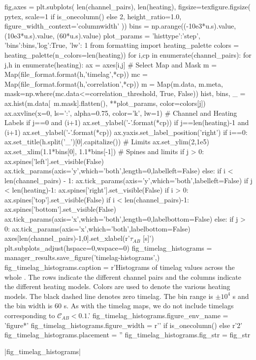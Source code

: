 \begin{pycode}
fig,axes = plt.subplots(
    len(channel_pairs), len(heating),
    figsize=texfigure.figsize(
        pytex,
        scale=1 if is_onecolumn() else 2,
        height_ratio=1.0,
        figure_width_context='columnwidth'
))
bins = np.arange((-10e3*u.s).value, (10e3*u.s).value, (60*u.s).value)
plot_params = {'histtype':'step', 'bins':bins,'log':True,
                'lw': 1}
from formatting import heating_palette
colors = heating_palette(n_colors=len(heating))
for i,cp in enumerate(channel_pairs):
    for j,h in enumerate(heating):
        ax = axes[i,j]
        # Select Map and Mask
        m = Map(file_format.format(h,'timelag',*cp))
        mc = Map(file_format.format(h,'correlation',*cp))
        m = Map(m.data, m.meta, mask=np.where(mc.data<=correlation_threshold, True, False))
        hist, bins, _ = ax.hist(m.data[~m.mask].flatten(), **plot_params, color=colors[j])
        ax.axvline(x=0, ls=':', alpha=0.75, color='k', lw=1)
        # Channel and Heating Labels
        if j==0 and (i+1)%
            ax.set_ylabel('{}-{}'.format(*cp))
        if j==len(heating)-1 and (i+1)%
            ax.set_ylabel('{}-{}'.format(*cp))
            ax.yaxis.set_label_position('right')
        if i==0:
            ax.set_title(h.split('_')[0].capitalize())
        # Limits
        ax.set_ylim(2,1e5)
        ax.set_xlim(1.1*bins[0], 1.1*bins[-1])
        # Spines and limits
        if j > 0:
            ax.spines['left'].set_visible(False)
            ax.tick_params(axis='y',which='both',length=0,labelleft=False)
        else:
            if i < len(channel_pairs) - 1:
                ax.tick_params(axis='y',which='both',labelleft=False)
        if j < len(heating)-1:
            ax.spines['right'].set_visible(False)
        if i > 0:
            ax.spines['top'].set_visible(False)
        if i < len(channel_pairs)-1:
            ax.spines['bottom'].set_visible(False)
            ax.tick_params(axis='x',which='both',length=0,labelbottom=False)
        else:
            if j > 0:
                ax.tick_params(axis='x',which='both',labelbottom=False)
axes[len(channel_pairs)-1,0].set_xlabel(r'$\tau_{AB}$ [s]')
plt.subplots_adjust(hspace=0,wspace=0)
fig_timelag_histograms = manager_results.save_figure('timelag-histograms',)
fig_timelag_histograms.caption = r'Histograms of timelag values across the whole \AR{}. The rows indicate the different channel pairs and the columns indicate the different heating models. Colors are used to denote the various heating models. The black dashed line denotes zero timelag. The bin range is $\pm10^4$ s and the bin width is 60 s. As with the timelag maps, we do not include timelags corresponding to $\mathcal{C}_{AB}<0.1$.'
fig_timelag_histograms.figure_env_name = 'figure*'
fig_timelag_histograms.figure_width = r'\columnwidth' if is_onecolumn() else r'2\columnwidth'
fig_timelag_histograms.placement = ''
fig_timelag_histograms.fig_str = fig_str
\end{pycode}
|fig_timelag_histograms|

